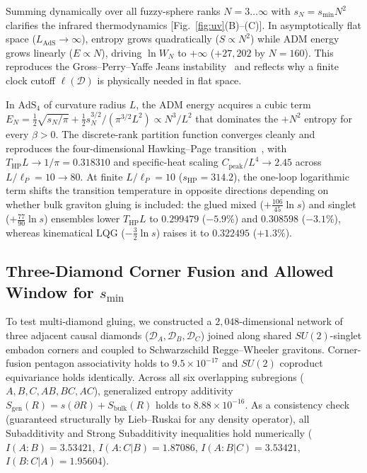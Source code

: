 \documentclass[onecolumn,11pt,aps,prd,amsmath,amssymb,nofootinbib,floatfix]{revtex4-2}
\newcommand{\scrD}{\mathscr{D}}
\newcommand{\lP}{\ell_P}
\begin{document}
Summing dynamically over all fuzzy-sphere ranks $N=3\dots\infty$ with $s_N=s_{\min}N^2$ clarifies the infrared thermodynamics [Fig.~\ref{fig:uv}(B)--(C)]. In asymptotically flat space ($L_{\mathrm{AdS}}\to\infty$), entropy grows quadratically ($S\propto N^2$) while ADM energy grows linearly ($E\propto N$), driving $\ln W_N$ to $+\infty$ ($+27{,}202$ by $N=160$). This reproduces the Gross--Perry--Yaffe Jeans instability~\cite{GrossPerryYaffe1982} and reflects why a finite clock cutoff $\ell(\scrD)$ is physically needed in flat space.

In $\mathrm{AdS}_4$ of curvature radius $L$, the ADM energy acquires a cubic term $E_N=\frac{1}{2}\sqrt{s_N/\pi}+\frac{1}{2}s_N^{3/2}/(\pi^{3/2}L^2)\propto N^3/L^2$ that dominates the $+N^2$ entropy for every $\beta>0$. The discrete-rank partition function converges cleanly and reproduces the four-dimensional Hawking--Page transition~\cite{HawkingPage1983}, with $T_{\mathrm{HP}}L\to 1/\pi=0.318310$ and specific-heat scaling $C_{\mathrm{peak}}/L^4\to 2.45$ across $L/\lP=10\to 80$. At finite $L/\lP=10$ ($s_{\mathrm{HP}}=314.2$), the one-loop logarithmic term shifts the transition temperature in opposite directions depending on whether bulk graviton gluing is included: the glued mixed ($+\frac{106}{45}\ln s$) and singlet ($+\frac{77}{90}\ln s$) ensembles lower $T_{\mathrm{HP}}L$ to $0.299479$ ($-5.9\%$) and $0.308598$ ($-3.1\%$), whereas kinematical LQG ($-\frac{3}{2}\ln s$) raises it to $0.322495$ ($+1.3\%$).

\subsection{Three-Diamond Corner Fusion and Allowed Window for $s_{\min}$}\label{sec:uv_multidiamond}

To test multi-diamond gluing, we constructed a $2{,}048$-dimensional network of three adjacent causal diamonds ($\scrD_A,\scrD_B,\scrD_C$) joined along shared $SU(2)$-singlet embadon corners and coupled to Schwarzschild Regge--Wheeler gravitons. Corner-fusion pentagon associativity holds to $9.5\times 10^{-17}$ and $SU(2)$ coproduct equivariance holds identically. Across all six overlapping subregions ($A,B,C,AB,BC,AC$), generalized entropy additivity $S_{\mathrm{gen}}(R)=s(\partial R)+S_{\mathrm{bulk}}(R)$ holds to $8.88\times 10^{-16}$. As a consistency check (guaranteed structurally by Lieb--Ruskai for any density operator), all Subadditivity and Strong Subadditivity inequalities hold numerically ($I(A:B)=3.53421$, $I(A:C|B)=1.87086$, $I(A:B|C)=3.53421$, $I(B:C|A)=1.95604$).
\end{document}
